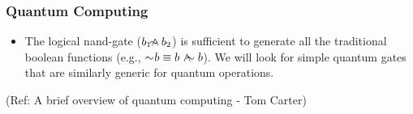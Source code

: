  \begin{frame}[fragile]\frametitle{Quantum Computing}

\begin{itemize}

	\item The logical nand-gate ($b_1\land\negthickspace\negthickspace\negmedspace\negthinspace\negthinspace\sim b_2$) is sufficient to generate all the traditional boolean functions (e.g., $\sim\negmedspace b \equiv b\ \lnanda b$).  We will look for simple quantum gates that are similarly generic for quantum operations.
\end{itemize}

\tiny{(Ref: A brief overview of quantum computing - Tom Carter)}

\end{frame}

